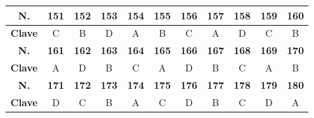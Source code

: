 \begin{center}
\begin{tabular}{|c|c|c|c|c|c|c|c|c|c|c|}
\hline
\textbf{N.} & \textbf{151} & \textbf{152} & \textbf{153} & \textbf{154} & \textbf{155} & \textbf{156} & \textbf{157} & \textbf{158} & \textbf{159} & \textbf{160} \\
\hline
\textbf{Clave} & C & B & D & A & B & C & A & D & C & B \\
\hline
\textbf{N.} & \textbf{161} & \textbf{162} & \textbf{163} & \textbf{164} & \textbf{165} & \textbf{166} & \textbf{167} & \textbf{168} & \textbf{169} & \textbf{170} \\
\hline
\textbf{Clave} & A & D & B & C & A & D & B & C & A & B \\
\hline
\textbf{N.} & \textbf{171} & \textbf{172} & \textbf{173} & \textbf{174} & \textbf{175} & \textbf{176} & \textbf{177} & \textbf{178} & \textbf{179} & \textbf{180} \\
\hline
\textbf{Clave} & D & C & B & A & C & D & B & C & D & A \\
\hline
\end{tabular}
\end{center}
